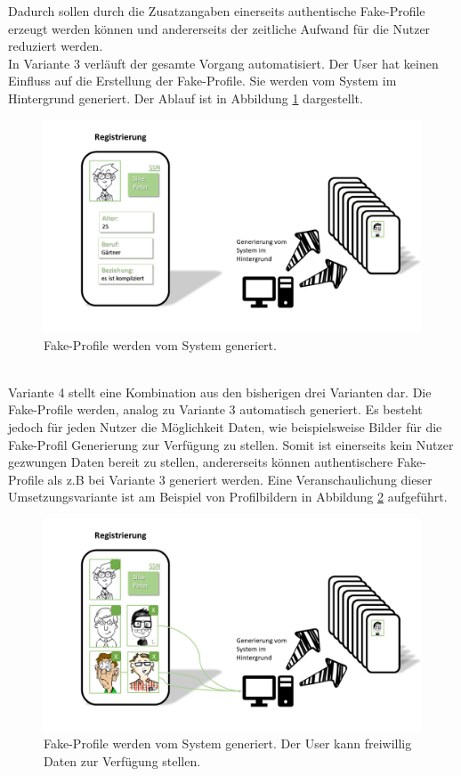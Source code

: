 \documentclass{sigchi}
\begin{document}
Dadurch sollen durch die Zusatzangaben einerseits authentische Fake-Profile erzeugt werden können und andererseits der zeitliche Aufwand für die Nutzer reduziert werden. \\
In Variante 3 verläuft der gesamte Vorgang automatisiert. Der User hat keinen Einfluss auf die Erstellung der Fake-Profile. Sie werden vom System im Hintergrund generiert. Der Ablauf ist in Abbildung \ref{fig:Umsetzung3} dargestellt.
\begin{figure}[htbp]
	\includegraphics[width=0.8\columnwidth]{figures/Umsetzung3.PNG}
	\caption{Fake-Profile werden vom System generiert.}
	\label{fig:Umsetzung3}
\end{figure}
\\
Variante 4 stellt eine Kombination aus den bisherigen drei Varianten dar. Die Fake-Profile werden, analog zu Variante 3 automatisch generiert. Es besteht jedoch für jeden Nutzer die Möglichkeit Daten, wie beispielsweise Bilder für die Fake-Profil Generierung zur Verfügung zu stellen. Somit ist einerseits kein Nutzer gezwungen Daten bereit zu stellen, andererseits können authentischere Fake-Profile als z.B bei Variante 3 generiert werden. Eine Veranschaulichung dieser Umsetzungsvariante ist am Beispiel von Profilbildern in Abbildung \ref{fig:Umsetzung4} aufgeführt. 
\begin{figure}[htbp]
	\includegraphics[width=\columnwidth]{figures/Umsetzung4.PNG}
	\caption{Fake-Profile werden vom System generiert. Der User kann freiwillig Daten zur Verfügung stellen.}
	\label{fig:Umsetzung4}
\end{figure}
\end{document}
